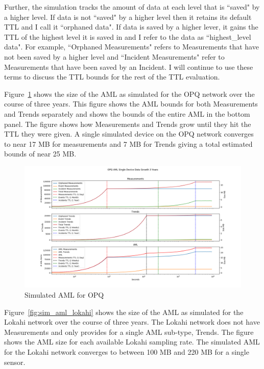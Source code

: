 Further, the simulation tracks the amount of data at each level that is ``saved" by a higher level. If data is not ``saved" by a higher level then it retains its default TTL and I call it ``orphaned data". If data is saved by a higher lever, it gains the TTL of the highest level it is saved in and I refer to the data as ``highest\_level data". For example, ``Orphaned Measurements" refers to Measurements that have not been saved by a higher level and ``Incident Measurements" refer to Measurements that have been saved by an Incident. I will continue to use these terms to discuss the TTL bounds for the rest of the TTL evaluation.

Figure~\ref{fig:sim_aml_opq} shows the size of the AML as simulated for the OPQ network over the course of three years. This figure shows the AML bounds for both Measurements and Trends separately and shows the bounds of the entire AML in the bottom panel. The figure shows how Measurements and Trends grow until they hit the TTL they were given. A single simulated device on the OPQ network converges to near 17 MB for measurements and 7 MB for Trends giving a total estimated bounds of near 25 MB\@.

\begin{figure}[H]
	\centering
	\includegraphics[width=\linewidth]{figures/sim_aml_opq.png}
	\caption{Simulated AML for OPQ}
	\label{fig:sim_aml_opq}
\end{figure}

Figure~\ref{fig:sim_aml_lokahi} shows the size of the AML as simulated for the Lokahi network over the course of three years. The Lokahi network does not have Measurements and only provides for a single AML sub-type, Trends. The figure shows the AML size for each available Lokahi sampling rate. The simulated AML for the Lokahi network converges to between 100 MB and 220 MB for a single sensor.

